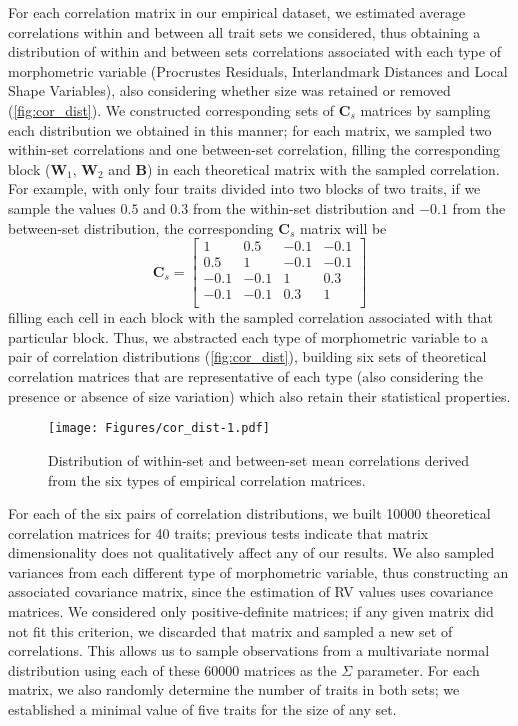 \documentclass[12pt,twoside]{report}
\begin{document}
For each correlation matrix in our empirical dataset, we estimated
average correlations within and between all trait sets we considered,
thus obtaining a distribution of within and between sets correlations
associated with each type of morphometric variable (Procrustes
Residuals, Interlandmark Distances and Local Shape Variables), also
considering whether size was retained or removed
(\autoref{fig:cor_dist}). We constructed corresponding sets of
$\mathbf{C}_{s}$ matrices by sampling each distribution we obtained in
this manner; for each matrix, we sampled two within-set correlations and
one between-set correlation, filling the corresponding block
($\mathbf{W}_1$, $\mathbf{W}_2$ and $\mathbf{B}$) in each theoretical
matrix with the sampled correlation. For example, with only four traits
divided into two blocks of two traits, if we sample the values $0.5$ and
$0.3$ from the within-set distribution and $-0.1$ from the between-set
distribution, the corresponding $\mathbf{C}_{s}$ matrix will be \[
\mathbf{C}_s =
\begin{bmatrix}
1 & 0.5 & -0.1 & -0.1 \\
0.5 & 1 & -0.1 & -0.1 \\
-0.1 & -0.1 & 1 & 0.3 \\
-0.1 & -0.1 & 0.3 & 1 \\
\end{bmatrix}
\] filling each cell in each block with the sampled correlation
associated with that particular block. Thus, we abstracted each type of
morphometric variable to a pair of correlation distributions
(\autoref{fig:cor_dist}), building six sets of theoretical correlation
matrices that are representative of each type (also considering the
presence or absence of size variation) which also retain their
statistical properties.

\begin{figure}[htbp]
\centering
\texttt{[image: Figures/cor\_dist-1.pdf]}
\caption{Distribution of within-set and between-set mean correlations
derived from the six types of empirical correlation matrices.
\label{fig:cor_dist}}
\end{figure}

For each of the six pairs of correlation distributions, we built 10000
theoretical correlation matrices for 40 traits; previous tests indicate
that matrix dimensionality does not qualitatively affect any of our
results. We also sampled variances from each different type of
morphometric variable, thus constructing an associated covariance
matrix, since the estimation of RV values uses covariance matrices. We
considered only positive-definite matrices; if any given matrix did not
fit this criterion, we discarded that matrix and sampled a new set of
correlations. This allows us to sample observations from a multivariate
normal distribution using each of these 60000 matrices as the $\Sigma$
parameter. For each matrix, we also randomly determine the number of
traits in both sets; we established a minimal value of five traits for
the size of any set.
\end{document}
